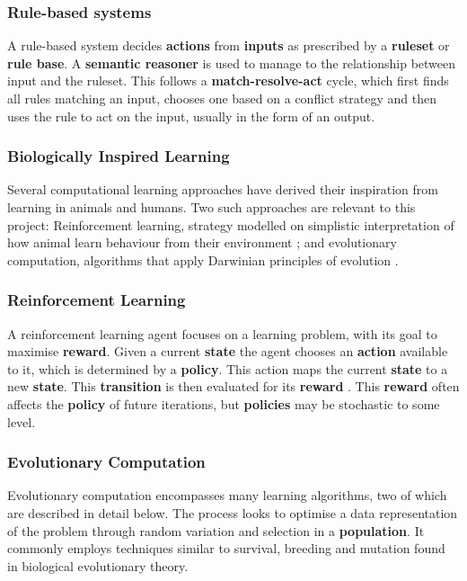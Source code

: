 \subsubsection{Rule-based systems}

A rule-based system decides \textbf{actions} from \textbf{inputs} as prescribed by a \textbf{ruleset} or \textbf{rule base}. A \textbf{semantic reasoner} is used to manage to the relationship between input and the ruleset. This follows a \textbf{match-resolve-act} cycle, which first finds all rules matching an input, chooses one based on a conflict strategy and then uses the rule to act on the input, usually in the form of an output. \cite[pp.~28-29]{rbsys}

\subsubsection{Biologically Inspired Learning} 

Several computational learning approaches have derived their inspiration from learning in animals and humans. Two such approaches are relevant to this project: Reinforcement learning, strategy modelled on simplistic interpretation of how animal learn behaviour from their environment \cite[s.~1.2]{suttonrl}; and evolutionary computation, algorithms that apply Darwinian principles of evolution \cite{ev-comp}.


\subsubsection*{Reinforcement Learning}

A reinforcement learning agent focuses on a learning problem, with its goal to maximise \textbf{reward}. Given a current \textbf{state} the agent chooses an \textbf{action} available to it, which is determined by a \textbf{policy}. This action maps the current \textbf{state} to a new \textbf{state}. This \textbf{transition} is then evaluated for its \textbf{reward} . This \textbf{reward} often affects the \textbf{policy} of future iterations, but \textbf{policies} may be stochastic to some level. \cite[s.~1.3]{suttonrl}

\subsubsection*{Evolutionary Computation}

Evolutionary computation encompasses many learning algorithms, two of which are described in detail below. The process looks to optimise a data representation of the problem through random variation and selection in a \textbf{population}. It commonly employs techniques similar to survival, breeding and mutation found in biological evolutionary theory.  \cite{ev-comp}
	
